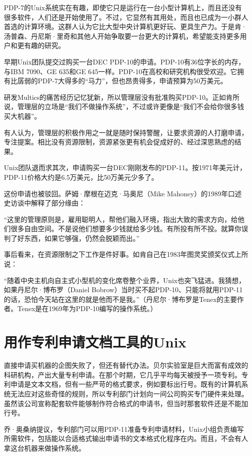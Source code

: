 \documentclass[a4paper,12pt,UTF8,twoside]{ctexbook}
\begin{document}
PDP-7的Unix系统实在有趣，即使它只是运行在一台小型计算机上，而且还没有很多软件，人们还是开始使用了。不过，它显然有其用处，而且也已成为一小群人首选的计算环境。这群人认为它比大型中央计算机更好玩、更具生产力。于是肯·汤普森、丹尼斯·里奇和其他人开始争取要一台更大的计算机，希望能支持更多用户和更有趣的研究。

早期Unix团队提交过购买一台DEC PDP-10的申请。PDP-10有36位字长的内存，与IBM 7090、GE 635和GE 645一样。PDP-10在高校和研究机构很受欢迎。它拥有比孱弱的PDP-7大得多的“马力”，但也昂贵得多，申请预算为50万美元。

研发Multics的痛苦经历记忆犹新，所以管理层没有批准购买PDP-10。正如肯所说，管理层的立场是“我们不做操作系统”，不过或许更像是“我们不会给你很多钱买大机器”。

有人认为，管理层的积极作用之一就是随时保持警醒，让要求资源的人打磨申请，专注提案。相比没有资源限制，资源紧张更有机会促成好的、经过深思熟虑的结果。

Unix团队退而求其次，申请购买一台DEC刚刚发布的PDP-11。按1971年美元计，PDP-11价格大约是6.5万美元，比50万美元少多了。

这份申请也被驳回。萨姆·摩根在迈克·马奥尼（Mike Mahoney）的1989年口述史访谈中解释了部分缘由：

“这里的管理原则是，雇用聪明人，帮他们融入环境，指出大致的需求方向，给他们很多自由空间。不是说他们想要多少钱就给多少钱。有所投有所不投。就算你误判了好东西，如果它够强，仍然会脱颖而出。”

事后看来，在资源限制之下工作是件好事。如肯自己在1983年图灵奖颁奖仪式上所说：

“随着中央主机向自主式小型机的变化席卷整个业界，Unix也突飞猛进。我猜想，如果丹尼尔·博布罗（Daniel Bobrow）当时买不起PDP-10、只能将就用PDP-11的话，恐怕今天站在这里的就是他而不是我。”（丹尼尔·博布罗是Tenex的主要作者。Tenex是在1969年为PDP-10编写的操作系统。）

\section{用作专利申请文档工具的Unix}

直接申请买机器的企图失败了，但还有替代办法。贝尔实验室是巨大而富有成效的科研机构，产出大量专利申请。在那个时期，它几乎平均每天被授予一项专利。专利申请是文本文档，但有一些严苛的格式要求，例如要标出行号。既有的计算机系统无法应对这些奇怪的规则，所以专利部门计划向一间公司购买专门硬件来处理。虽然该公司宣称配套软件能够制作符合格式的申请书，但当时那套软件还是不能加行号。

乔·奥桑纳提议，专利部门可以用PDP-11准备专利申请材料，Unix小组负责编写所需软件，包括能以合适格式输出申请书的文本格式化程序在内。而且，不会有人拿这台机器来做操作系统。
\end{document}
